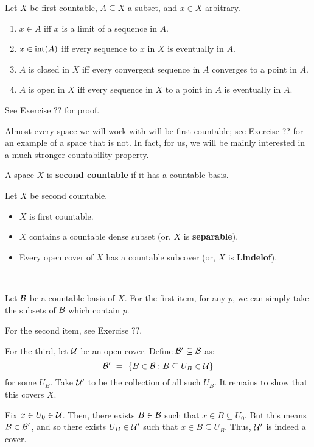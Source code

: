 \begin{lm}
    Let $ X $ be first countable, $ A \subseteq X $ a subset, and $ x \in X $
    arbitrary.
    \begin{enumerate}
        \item $ x \in \bar{A} $ iff $ x $ is a limit of a sequence in $ A $.
        \item $ x \in \operatorname{int}(A) $ iff every sequence to $ x $ in $ X $ is
            eventually in $ A $.
        \item $ A $ is closed in $ X $ iff every convergent sequence in $ A $
            converges to a point in $ A $.
        \item $ A $ is open in $ X $ iff every sequence in $ X $ to a point in
            $ A $ is eventually in $ A $.
    \end{enumerate}
\end{lm}

See Exercise ?? for proof.

Almost every space we will work with will be first countable; see Exercise ?? for
an example of a space that is not. In fact, for us, we will be mainly interested
in a much stronger countability property.

\begin{defn}
    A space $ X $ is \textbf{second countable} if it has a countable basis.
\end{defn}

\begin{prop}
    Let $ X $ be second countable.
    \begin{itemize}
        \item $ X $ is first countable.
        \item $ X $ contains a countable dense subset (or, $ X $ is
            \textbf{separable}).
        \item Every open cover of $ X $ has a countable subcover (or, $ X $ is
            \textbf{Lindelof}).
    \end{itemize}
\end{prop} \

\begin{pf}[source=Primary Source Material]
    Let $ \mathcal{B} $ be a countable basis of $ X $. For the first item, for any
    $ p $, we can simply take the subsets of $ \mathcal{B} $ which contain $ p $.

    For the second item, see Exercise ??.

    For the third, let $ \mathcal{U} $ be an open cover. Define $ \mathcal{B}' \subseteq
    \mathcal{B} $ as:
    \begin{equation*}
        \mathcal{B}' \ = \ \left\{{B \in \mathcal{B}:B \subseteq U_{B} \in \mathcal{U}}\right\}
    \end{equation*}
    for some $ U_{B} $. Take $ \mathcal{U}' $ to be the collection of all such
    $ U_{B} $. It remains to show that this covers $ X $.

    Fix $ x \in U_{0} \in \mathcal{U} $. Then, there exists $ B \in \mathcal{B} $
    such that $ x \in B \subseteq U_{0} $. But this means $ B \in
    \mathcal{B}' $, and so there exists $ U_{B} \in \mathcal{U}' $ such that
    $ x \in B \subseteq U_{B} $. Thus, $ \mathcal{U}' $ is indeed a cover.
\end{pf}

